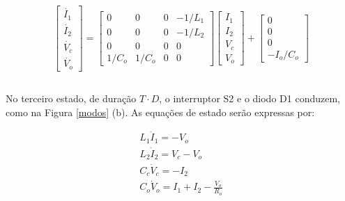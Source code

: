 \documentclass[
        12pt,
        openany, %
        oneside, %
        a4paper,			
        english,			
        brazil
        ]{abntbibufjf}
\begin{document}
\begin{equation}
\begin{array}{cc}
\begin{bmatrix}\dot{I_1} \\\dot{I_2} \\\dot{V_c} \\\dot{V_o}\end{bmatrix}=\begin{bmatrix}0&0&0&-1/L_1 \\ 0&0&0&-1/L_2 \\ 0&0&0&0 \\ 1/C_o&1/C_o&0&0\end{bmatrix}\begin{bmatrix}I_1 \\I_2 \\V_c \\V_o
\end{bmatrix}+\begin{bmatrix}0\\0\\0\\-I_o/C_o\end{bmatrix}\\\\
\end{array}
\end{equation}

No terceiro estado, de duração $T \cdot D$, o interruptor S2 e o diodo D1 conduzem, como na Figura \ref{modos} (b). As equações de estado serão expressas por:

\begin{equation}
\begin{array}{cc}
L_1 \dot{I}_1 = - V_o\\
L_2 \dot{I}_2 = V_c - V_{o}\\
C_c \dot{V}_c = -I_2\\
C_o \dot{V}_o = I_1+I_2-\frac{V_o}{R_o}
\end{array}
\end{equation}
\end{document}
